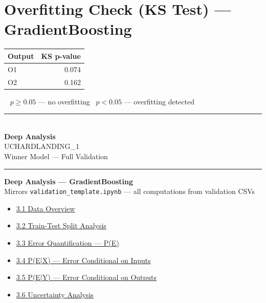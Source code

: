 \documentclass[9pt,a4paper]{article}
\begin{document}
\section{Overfitting Check (KS Test) --- GradientBoosting}
\begin{minipage}{\linewidth}
\renewcommand{\arraystretch}{1.15}
\begin{tabular}{|l|r|}
  \hline\textbf{Output} & \textbf{KS p-value} \\ \hline
  O1 & \cellcolor{passgreen}0.074 \\ \hline
  O2 & \cellcolor{passgreen}0.162 \\ \hline
\end{tabular}
\par\vspace{4pt}
{\footnotesize \colorbox{passgreen}{\ } $p\geq 0.05$ --- no overfitting\enspace \colorbox{failred}{\ } $p<0.05$ --- overfitting detected}
\end{minipage}
\clearpage
\thispagestyle{empty}
\vspace*{\fill}
\begin{center}
  \textcolor{sepgray}{\rule{0.40\linewidth}{1pt}}\\[20pt]
  {\Huge\bfseries\color{primary} Deep Analysis}\\[10pt]
  {\large\color{sepgray} UCHARDLANDING\_1}\\[6pt]
  {\normalsize\color{sepgray} Winner Model --- Full Validation}\\[20pt]
  \textcolor{sepgray}{\rule{0.40\linewidth}{1pt}}
\end{center}
\vspace*{\fill}
\clearpage
\label{sec:deepanalysis}
\begin{center}
  {\normalsize\bfseries\color{primary} Deep Analysis --- GradientBoosting}\\[2pt]
  {\small\color{sepgray} Mirrors \texttt{validation\_template.ipynb} --- all computations from validation CSVs}
\end{center}
\vspace{4pt}
\begin{itemize}[leftmargin=2em,itemsep=1pt,topsep=2pt]
  \item \hyperref[sec:d1]{3.1 Data Overview}
  \item \hyperref[sec:d2]{3.2 Train-Test Split Analysis}
  \item \hyperref[sec:d3]{3.3 Error Quantification --- P(E)}
  \item \hyperref[sec:d4]{3.4 P(E|X) --- Error Conditional on Inputs}
  \item \hyperref[sec:d5]{3.5 P(E|Y) --- Error Conditional on Outputs}
  \item \hyperref[sec:d6]{3.6 Uncertainty Analysis}
\end{itemize}
\end{document}
